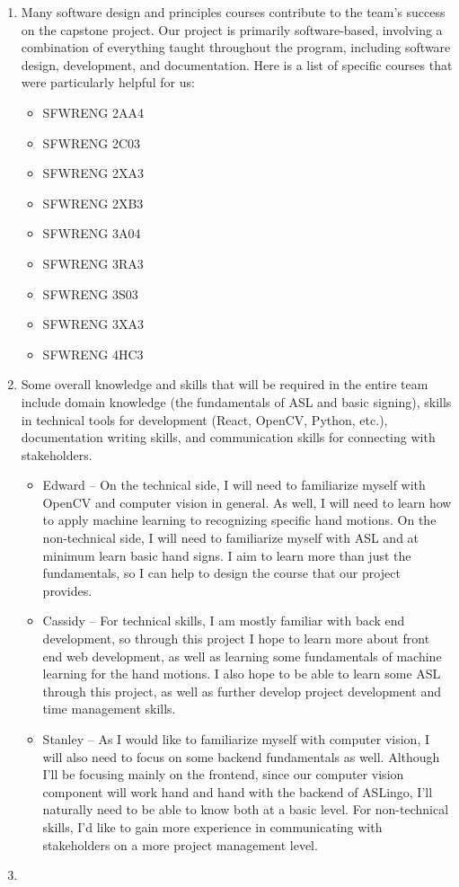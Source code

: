 \documentclass[12pt, titlepage]{article}
\begin{document}
\begin{enumerate}
    \item Many software design and principles courses contribute to the team's success on the capstone project. Our project is primarily software-based, involving a combination of everything taught throughout the program, including software design, development, and documentation. Here is a list of specific courses that were particularly helpful for us: 
    \begin{itemize}
        \item SFWRENG 2AA4
        \item SFWRENG 2C03
        \item SFWRENG 2XA3
        \item SFWRENG 2XB3
        \item SFWRENG 3A04
        \item SFWRENG 3RA3
        \item SFWRENG 3S03
        \item SFWRENG 3XA3
        \item SFWRENG 4HC3
    \end{itemize}
    \item Some overall knowledge and skills that will be required in the entire team include domain knowledge (the fundamentals of ASL and basic signing), skills in technical tools for development (React, OpenCV, Python, etc.), documentation writing skills, and communication skills for connecting with stakeholders.
    \begin{itemize}
        \item Edward -- On the technical side, I will need to familiarize myself with OpenCV and computer vision in general. As well, I will need to learn how to apply machine learning to recognizing specific hand motions. On the non-technical side, I will need to familiarize myself with ASL and at minimum learn basic hand signs. I aim to learn more than just the fundamentals, so I can help to design the course that our project provides.
	    \item Cassidy -- For technical skills, I am mostly familiar with back end development, so through this project I hope to learn more about front end web development, as well as learning some fundamentals of machine learning for the hand motions. I also hope to be able to learn some ASL through this project, as well as further develop project development and time management skills.
        \item Stanley -- As I would like to familiarize myself with computer vision, I will also need to focus on some backend fundamentals as well. Although I'll be focusing mainly on the frontend, since our computer vision component will work hand and hand with the backend of ASLingo, I'll naturally need to be able to know both at a basic level. For non-technical skills, I'd like to gain more experience in communicating with stakeholders on a more project management level.
    \end{itemize}
    \item 
\end{enumerate}
\end{document}

